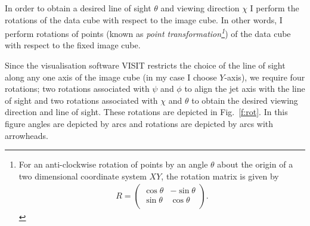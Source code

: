 \begin{appendices}
In order to obtain a desired line of sight $\theta$ and viewing direction $\chi$ I perform the rotations of the data cube with respect to the image cube. In other words, I perform rotations of points (known as \emph{point transformation\footnote{For an anti-clockwise rotation of points by an angle $\theta$ about the origin of a two dimensional coordinate system $XY$, the rotation matrix is given by \begin{eqnarray}
R = \begin{pmatrix}
 \cos\theta & -\sin\theta \\
\sin\theta & \cos\theta \nonumber \\
\end{pmatrix}.
\end{eqnarray}}})
of the data cube with respect to the fixed image cube. 

Since the visualisation software VISIT restricts the choice of the line of sight along any one axis of the image cube (in my case I choose $Y$-axis), we require four rotations; two rotations associated with $\psi$ and $\phi$ to align the jet axis with the line of sight and two rotations associated with $\chi$ and $\theta$ to obtain the desired viewing direction and line of sight. These rotations are depicted in Fig.~\ref{f:rot}. In this figure angles are depicted by arcs and rotations are depicted by arcs with arrowheads. 



\end{appendices}
